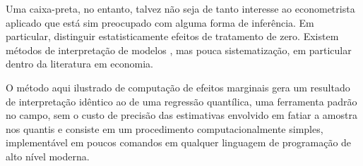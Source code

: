 Uma caixa-preta, no entanto, talvez não seja de tanto interesse ao econometrista aplicado que está sim preocupado com alguma forma de inferência. Em particular, distinguir estatisticamente efeitos de tratamento de zero. Existem métodos de interpretação de modelos \cite{ribeiro2016model}, mas pouca sistematização, em particular dentro da literatura em economia. 

O método aqui ilustrado de computação de efeitos marginais gera um resultado de interpretação idêntico ao de uma regressão quantílica, uma ferramenta padrão no campo, sem o custo de precisão das estimativas envolvido em fatiar a amostra nos quantis e consiste em um procedimento computacionalmente simples, implementável em poucos comandos em qualquer linguagem de programação de alto nível moderna. 

